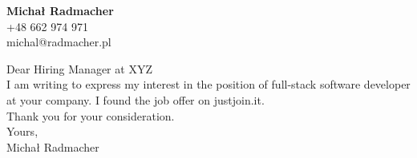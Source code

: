 \documentclass[a4paper]{article}
\begin{document}
\begin{flushright}
\textbf{Michał Radmacher}
\\
+48 662 974 971
\\
michal@radmacher.pl
\end{flushright}

Dear Hiring Manager at XYZ
\\

I am writing to express my interest in the position of full-stack software developer at your company.
I found the job offer on justjoin.it.
\\

Thank you for your consideration.
\\

Yours,
\\

Michał Radmacher
\end{document}

